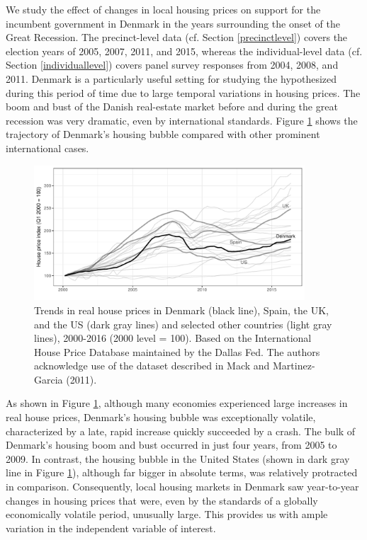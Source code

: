 \documentclass[12pt,a4paper]{article}
\begin{document}
	We study the effect of changes in local housing prices on support for the incumbent government in Denmark in the years surrounding the onset of the Great Recession. The precinct-level data (cf. Section \ref{precinctlevel}) covers the election years of 2005, 2007, 2011, and 2015, whereas the individual-level data (cf. Section \ref{individuallevel}) covers panel survey responses from 2004, 2008, and 2011. Denmark is a particularly useful setting for studying the hypothesized during this period of time due to large temporal variations in housing prices. The boom and bust of the Danish real-estate market before and during the great recession was very dramatic, even by international standards. Figure \ref{hpd} shows the trajectory of Denmark's housing bubble compared with other prominent international cases.
	
	
	
	\begin{figure}[htbp!]
		\includegraphics[width=0.9\textwidth]{../figures/timeplot}
		\centering
		\caption{Trends in real house prices in Denmark (black line), Spain, the UK, and the US (dark gray lines) and selected other countries (light gray lines), 2000-2016 (2000 level = 100). Based on the International House Price Database maintained by the Dallas Fed. The authors acknowledge use of the dataset described in Mack and Martinez-Garcia (2011).}\label{hpd}
	\end{figure}
	
	As shown in Figure \ref{hpd}, although many economies experienced large increases in real house prices, Denmark's housing bubble was exceptionally volatile, characterized by a late, rapid increase quickly succeeded by a crash. The bulk of Denmark's housing boom and bust occurred in just four years, from 2005 to 2009. In contrast, the housing bubble in the United States (shown in dark gray line in Figure \ref{hpd}), although far bigger in absolute terms, was relatively protracted in comparison. Consequently, local housing markets in Denmark saw year-to-year changes in housing prices that were, even by the standards of a globally economically volatile period, unusually large. This provides us with ample variation in the independent variable of interest.
	
\end{document}
